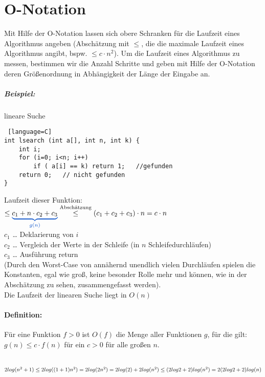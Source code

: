 \section{O-Notation}
Mit Hilfe der O-Notation lassen sich obere Schranken für die Laufzeit eines Algorithmus angeben (Abschätzung mit $\leq$, die die maximale Laufzeit eines Algorithmus angibt, bspw. $\leq c \cdot n^2$). Um die Laufzeit eines Algorithmus zu messen, bestimmen wir die Anzahl Schritte und geben mit Hilfe der O-Notation deren Größenordnung in Abhängigkeit der Länge der Eingabe an.

\subparagraph{Beispiel:} lineare Suche
\begin{lstlisting} [language=C]
int lsearch (int a[], int n, int k) {
	int i;
	for (i=0; i<n; i++)
		if ( a[i] == k) return 1;	//gefunden
	return 0;	// nicht gefunden
}
\end{lstlisting}
Laufzeit dieser Funktion:\\
$\leq \textcolor{blue}{\underbrace{\textcolor{black}{c_1+ n\cdot c_2+c_3}}_{g(n)}} \overset{\text{Abschätzung}}{\leq}(c_1+c_2+c_3)\cdot n= c \cdot n$\\
$c_1$ … Deklarierung von $i$\\
$c_2$ … Vergleich der Werte in der Schleife (in $n$ Schleifedurchläufen)\\
$c_3$ … Ausführung return\\
(Durch den Worst-Case von annähernd unendlich vielen Durchläufen spielen die Konstanten, egal wie groß, keine besonder Rolle mehr und können, wie in der Abschätzung zu sehen, zusammengefasst werden).\\
Die Laufzeit der linearen Suche liegt in $O(n)$

\paragraph{Definition:} Für eine Funktion $f>0$ ist $O(f)$ die Menge aller Funktionen $g$, für die gilt:\\
$g(n)\leq c\cdot f(n)$ für ein $c>0$ für alle großen $n$.\\
\\
$
2 log (n^2+1)\\
\leq 2 log ((1+1)n^2)\\
=2 log (2n^2)\\
= 2 log (2) + 2 log( n^2)\\
\leq (2log2+2)log(n^2)\\
= 2 (2log2+2)log(n)
$

